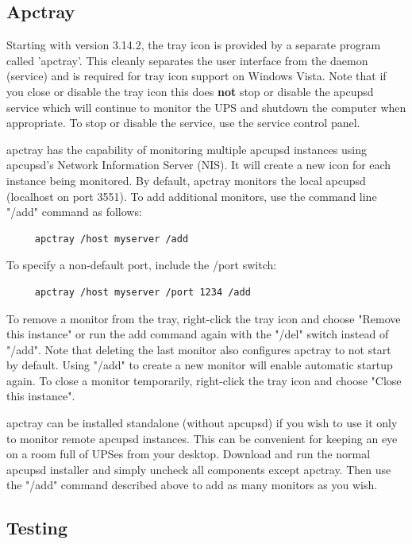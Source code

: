 {{{{{{{\label{Apctray}
\subsection*{Apctray}
Starting with version 3.14.2, the tray icon is provided by a separate 
program called 'apctray'. This cleanly separates the user interface
from the daemon (service) and is required for tray icon support on Windows
Vista. Note that if you close or disable the tray icon this does {\bf not}
stop or disable the apcupsd service which will continue to monitor the UPS
and shutdown the computer when appropriate. To stop or disable the service,
use the service control panel.

apctray has the capability of monitoring multiple apcupsd instances using
apcupsd's Network Information Server (NIS). It will create a new icon for 
each instance being monitored. By default, apctray monitors the local 
apcupsd (localhost on port 3551). To add additional monitors, use the
command line "/add" command as follows:

\begin{verbatim}
     apctray /host myserver /add
\end{verbatim}

To specify a non-default port, include the /port switch:

\begin{verbatim}
     apctray /host myserver /port 1234 /add
\end{verbatim}

To remove a monitor from the tray, right-click the tray icon and choose
"Remove this instance" or run the add command again with the "/del" switch
instead of "/add". Note that deleting the last monitor also configures
apctray to not start by default. Using "/add" to create a new monitor
will enable automatic startup again. To close a monitor temporarily,
right-click the tray icon and choose "Close this instance".

apctray can be installed standalone (without apcupsd) if you wish to use
it only to monitor remote apcupsd instances. This can be convenient for
keeping an eye on a room full of UPSes from your desktop. Download and
run the normal apcupsd installer and simply uncheck all components except
apctray. Then use the "/add" command described above to add as many
monitors as you wish.


\label{Testing}
\subsection*{Testing}

}}}}}}}
